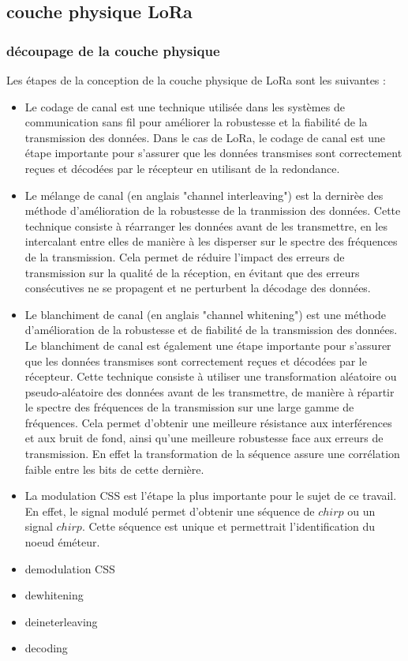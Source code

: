 \documentclass[12pt,a4paper,oneside, titlepage]{report}
\begin{document}
\subsection{couche physique LoRa}

\subsubsection{découpage de la couche physique}

Les étapes de la conception de la couche physique de LoRa sont les suivantes :
\begin{itemize}
\item Le codage de canal est une technique utilisée dans les systèmes de communication sans fil pour améliorer la robustesse et la fiabilité de la transmission des données. Dans le cas de LoRa, le codage de canal est une étape importante pour s'assurer que les données transmises sont correctement reçues et décodées par le récepteur en utilisant de la redondance.
\item Le mélange de canal (en anglais "channel interleaving") est la dernirèe des méthode d'amélioration de la robustesse de la tranmission des données. 
Cette technique consiste à réarranger les données avant de les transmettre, en les intercalant entre elles de manière à les disperser sur le spectre des fréquences de la transmission. Cela permet de réduire l'impact des erreurs de transmission sur la qualité de la réception, en évitant que des erreurs consécutives ne se propagent et ne perturbent la décodage des données.
\item Le blanchiment de canal (en anglais "channel whitening") est une méthode d'amélioration de la robustesse et de fiabilité de la transmission des données. Le blanchiment de canal est également une étape importante pour s'assurer que les données transmises sont correctement reçues et décodées par le récepteur.
Cette technique consiste à utiliser une transformation aléatoire ou pseudo-aléatoire des données avant de les transmettre, de manière à répartir le spectre des fréquences de la transmission sur une large gamme de fréquences. Cela permet d'obtenir une meilleure résistance aux interférences et aux bruit de fond, ainsi qu'une meilleure robustesse face aux erreurs de transmission. En effet la transformation de la séquence assure une corrélation faible entre les bits de cette dernière.
\item La modulation CSS est l'étape la plus importante pour le sujet de ce travail. En effet, le signal modulé permet d'obtenir une séquence de $chirp$ ou un signal $chirp$. Cette séquence est unique et permettrait l'identification du noeud éméteur. 
\item demodulation CSS
\item dewhitening
\item deineterleaving
\item decoding
\end{itemize}
\end{document}
